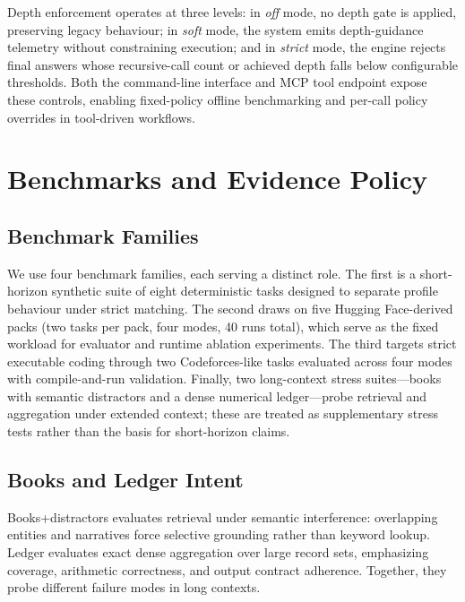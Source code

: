 \documentclass[11pt]{article}
\begin{document}
Depth enforcement operates at three levels: in \emph{off} mode, no depth gate is applied, preserving legacy behaviour; in \emph{soft} mode, the system emits depth-guidance telemetry without constraining execution; and in \emph{strict} mode, the engine rejects final answers whose recursive-call count or achieved depth falls below configurable thresholds. Both the command-line interface and MCP tool endpoint expose these controls, enabling fixed-policy offline benchmarking and per-call policy overrides in tool-driven workflows.

\section{Benchmarks and Evidence Policy}
\subsection{Benchmark Families}
We use four benchmark families, each serving a distinct role. The first is a short-horizon synthetic suite of eight deterministic tasks designed to separate profile behaviour under strict matching. The second draws on five Hugging Face-derived packs (two tasks per pack, four modes, 40 runs total), which serve as the fixed workload for evaluator and runtime ablation experiments. The third targets strict executable coding through two Codeforces-like tasks evaluated across four modes with compile-and-run validation. Finally, two long-context stress suites---books with semantic distractors and a dense numerical ledger---probe retrieval and aggregation under extended context; these are treated as supplementary stress tests rather than the basis for short-horizon claims.

\subsection{Books and Ledger Intent}
Books+distractors evaluates retrieval under semantic interference: overlapping entities and narratives force selective grounding rather than keyword lookup. Ledger evaluates exact dense aggregation over large record sets, emphasizing coverage, arithmetic correctness, and output contract adherence. Together, they probe different failure modes in long contexts.
\end{document}
